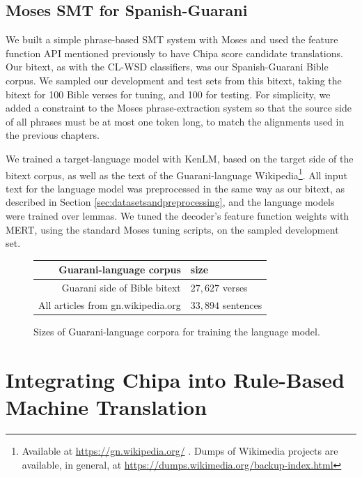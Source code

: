 \subsection{Moses SMT for Spanish-Guarani}
We built a simple phrase-based SMT system with Moses and used the feature
function API mentioned previously to have Chipa score candidate translations.
Our bitext, as with the CL-WSD classifiers, was our Spanish-Guarani Bible
corpus. We sampled our development and test sets from this bitext, taking the
bitext for 100 Bible verses for tuning, and 100 for testing.
For simplicity, we added a constraint to the Moses phrase-extraction system so
that the source side of all phrases must be at most one token long, to match
the alignments used in the previous chapters.

We trained a target-language model with KenLM\cite{Heafield-kenlm}, based on
the target side of the bitext corpus, as well as the text of the
Guarani-language Wikipedia\footnote{Available at
\url{https://gn.wikipedia.org/} . Dumps of Wikimedia projects are available, in
general, at \url{https://dumps.wikimedia.org/backup-index.html}}. All input
text for the language model was preprocessed in the same way as our bitext, as
described in Section \ref{sec:datasetsandpreprocessing}, and the language
models were trained over lemmas.
We tuned the decoder's feature function weights with MERT, using the standard
Moses tuning scripts, on the sampled development set.

\begin{figure}
  \begin{centering}
  \begin{tabulary}{\textwidth}{|R|L|}
    \hline
    Guarani-language corpus & size \\
    \hline
    Guarani side of Bible bitext &  $27,627$ verses \\
    \hline
    All articles from gn.wikipedia.org & $33,894$ sentences \\
    \hline
  \end{tabulary}
  \end{centering}
  \caption{Sizes of Guarani-language corpora for training the language model.}
  \label{fig:gn-lm-sizes}
\end{figure}

\section{Integrating Chipa into Rule-Based Machine Translation}

